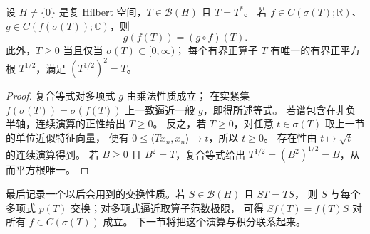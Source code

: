 \begin{corollary}[正平方根与复合]
\label{b1:cor:29-positive-square-root}
设 \(H\ne\{0\}\) 是复 Hilbert 空间，\(T\in\mathcal B(H)\) 且 \(T=T^*\)。
若 \(f\in C(\sigma(T);\mathbb R)\)、\(g\in C(f(\sigma(T));\mathbb C)\)，则
\[
 g(f(T))=(g\circ f)(T).
\]
此外，\(T\geq0\) 当且仅当 \(\sigma(T)\subset[0,\infty)\)；
每个有界正算子 \(T\) 有唯一的有界正平方根 \(T^{1/2}\)，满足 \((T^{1/2})^2=T\)。
\end{corollary}
\begin{proof}
复合等式对多项式 \(g\) 由乘法性质成立；
在实紧集 \(f(\sigma(T))=\sigma(f(T))\) 上一致逼近一般 \(g\)，即得所述等式。
若谱包含在非负半轴，连续演算的正性给出 \(T\geq0\)。
反之，若 \(T\geq0\)，对任意 \(t\in\sigma(T)\) 取上一节的单位近似特征向量，
便有 \(0\leq\langle Tx_n,x_n\rangle\to t\)，所以 \(t\geq0\)。
存在性由 \(t\mapsto\sqrt t\) 的连续演算得到。
若 \(B\geq0\) 且 \(B^2=T\)，复合等式给出
\(T^{1/2}=(B^2)^{1/2}=B\)，从而平方根唯一。
\end{proof}

最后记录一个以后会用到的交换性质。若 \(S\in\mathcal B(H)\) 且 \(ST=TS\)，
则 \(S\) 与每个多项式 \(p(T)\) 交换；对多项式逼近取算子范数极限，
可得 \(Sf(T)=f(T)S\) 对所有 \(f\in C(\sigma(T))\) 成立。
下一节将把这个演算与积分联系起来。
